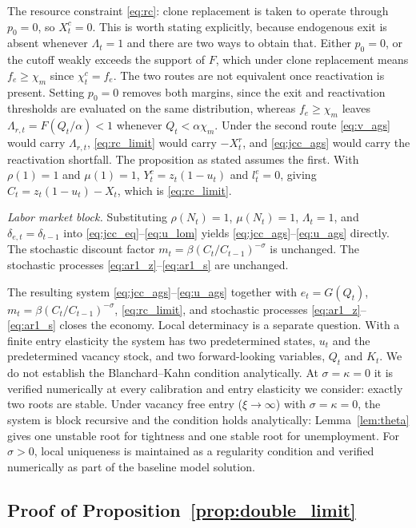 \documentclass[authoryear, review, 12pt]{elsarticle}
\begin{document}
The resource constraint \eqref{eq:rc}: clone
replacement is taken to operate through $p_0=0$, so
$X_t^c=0$. This is worth stating explicitly, because
endogenous exit is absent whenever $\Lambda_t=1$ and
there are two ways to obtain that. Either $p_0=0$, or
the cutoff weakly exceeds the support of $F$, which
under clone replacement means $f_e\geq\chi_m$ since
$\chi_t^c=f_e$. The two routes are not equivalent
once reactivation is present. Setting $p_0=0$ removes
both margins, since the exit and reactivation
thresholds are evaluated on the same distribution,
whereas $f_e\geq\chi_m$ leaves
$\Lambda_{r,t}=F(Q_t/\alpha)<1$ whenever
$Q_t<\alpha\chi_m$. Under the second route
\eqref{eq:v_ags} would carry $\Lambda_{r,t}$,
\eqref{eq:rc_limit} would carry $-X_t^r$, and
\eqref{eq:jcc_ags} would carry the reactivation
shortfall. The proposition as stated assumes the
first. With 
$\rho(1)=1$ and $\mu(1)=1$, $Y_t^c=z_t(1-u_t)$ 
and $l_t^e=0$, giving $C_t=z_t(1-u_t)-X_t$, 
which is \eqref{eq:rc_limit}.

\emph{Labor market block.} Substituting $\rho(N_t)=1$, 
$\mu(N_t)=1$, $\Lambda_t=1$, and 
$\delta_{e,t}=\delta_{t-1}$ into 
\eqref{eq:jcc_eq}--\eqref{eq:u_lom} yields 
\eqref{eq:jcc_ags}--\eqref{eq:u_ags} directly. 
The stochastic discount factor 
$m_t=\beta(C_t/C_{t-1})^{-\sigma}$ is unchanged. 
The stochastic processes \eqref{eq:ar1_z}--\eqref{eq:ar1_s} 
are unchanged.

The resulting system
\eqref{eq:jcc_ags}--\eqref{eq:u_ags} together
with $e_t=G(Q_t)$, $m_t=\beta(C_t/C_{t-1})^{-\sigma}$,
\eqref{eq:rc_limit}, and stochastic processes
\eqref{eq:ar1_z}--\eqref{eq:ar1_s} closes the economy. Local determinacy is a separate
question. With a finite entry elasticity the system has two predetermined states, $u_t$ and
the predetermined vacancy stock, and two forward-looking variables, $Q_t$ and $K_t$. We do
not establish the Blanchard--Kahn condition analytically. At $\sigma=\kappa=0$ it is verified
numerically at every calibration and entry elasticity we consider: exactly two roots are
stable. Under vacancy free entry ($\xi\to\infty$) with $\sigma=\kappa=0$, the system is block
recursive and the condition holds analytically: Lemma~\ref{lem:theta} gives one unstable
root for tightness and one stable root for unemployment. For $\sigma>0$, local uniqueness
is maintained as a regularity condition and verified numerically as part of the baseline
model solution.

\subsection*{Proof of Proposition~\ref{prop:double_limit}}
\end{document}
